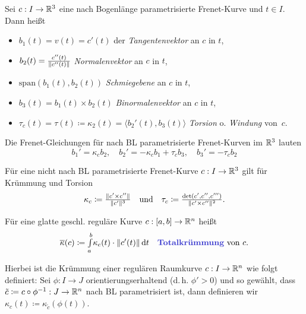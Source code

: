 \documentclass{cheat-sheet}
\newcommand{\Intabdt}[1]{\Int{a}{b}{#1}{t}}
\newcommand{\Span}{\mathrm{span}} %
\begin{document}
\begin{defn}
  Sei $c : I \to \mathbb{R}^3$ eine nach Bogenlänge parametrisierte Frenet-Kurve und $t \in I$. Dann heißt
  \begin{itemize}
    \item $b_1(t) = v(t) = c'(t)$ der \emph{Tangentenvektor} an $c$ in $t$,
    \item $b_2(t) = \tfrac{c''(t)}{\lVert c''(t)\rVert}$ \emph{Normalenvektor} an $c$ in $t$,
    \item $\Span(b_1(t), b_2(t))$ \emph{Schmiegebene} an $c$ in $t$,
    \item $b_3(t) = b_1(t) \times b_2(t)$ \emph{Binormalenvektor} an $c$ in $t$,
    \item $\tau_c(t) = \tau(t) \coloneqq \kappa_2(t) = \langle b_2'(t) , b_3(t) \rangle$ \emph{Torsion} o. \emph{Windung} von~$c$.
  \end{itemize}
\end{defn}

\begin{bem}
  Die Frenet-Gleichungen für nach BL parametrisierte Frenet-Kurven im $\mathbb{R}^3$ lauten
  \[
      b_1' = \kappa_c b_2, \quad
      b_2' = - \kappa_c b_1 + \tau_c b_3, \quad
      b_3' = - \tau_c b_2
  \]
\end{bem}


\begin{bem}
  Für eine nicht nach BL parametrisierte Frenet-Kurve $c : I \to \mathbb{R}^3$ gilt für Krümmung und Torsion
  \[
    \kappa_c \coloneqq \tfrac{\lVert c' \times c''\rVert}{\lVert c'\rVert^3}
    \quad \text{und} \quad
    \tau_c \coloneqq \tfrac{\det(c', c'', c''')}{\lVert c' \times c''\rVert^2}.
  \]
\end{bem}


\begin{defn}
  Für eine glatte geschl. reguläre Kurve $c : \left[ a, b \right] \to \mathbb{R}^n$ heißt
  \[
    \overline\kappa(c) \coloneqq \Intabdt{\kappa_c(t) \cdot \norm{c'(t)}}
    \quad \text{\emph{Totalkrümmung} von $c$.}
  \]

  Hierbei ist die Krümmung einer regulären Raumkurve $c : I \to \mathbb{R}^n$ wie folgt definiert:
  Sei $\phi : I \to J$ orientierungserhaltend
  (d.\,h. $\phi' > 0$) und so gewählt,
  dass $\tilde{c} \coloneqq c \circ \phi^{-1} : J \to \mathbb{R}^n$ nach
  BL parametrisiert ist, dann definieren wir $\kappa_c(t) \coloneqq \kappa_{\tilde{c}}(\phi(t))$.
\end{defn}
\end{document}
